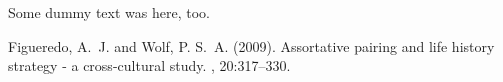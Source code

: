 \documentclass[twoside,twocolumn]{article}
\begin{document}
Some dummy text was here, too.


\begin{thebibliography}{99} %

Figueredo, A.~J. and Wolf, P. S.~A. (2009).
\newblock Assortative pairing and life history strategy - a cross-cultural
  study.
, 20:317--330.
 
\end{thebibliography}

\end{document}
